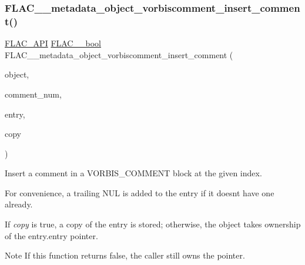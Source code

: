 \subsubsection{\texorpdfstring{F\+L\+A\+C\+\_\+\+\_\+metadata\+\_\+object\+\_\+vorbiscomment\+\_\+insert\+\_\+comment()}{FLAC\_\_metadata\_object\_vorbiscomment\_insert\_comment()}}
{\footnotesize\ttfamily \hyperlink{group__flac__export_ga56ca07df8a23310707732b1c0007d6f5}{F\+L\+A\+C\+\_\+\+A\+PI} \hyperlink{ordinals_8h_a95103469f1cbd78b8cf250194985b34e}{F\+L\+A\+C\+\_\+\+\_\+bool} F\+L\+A\+C\+\_\+\+\_\+metadata\+\_\+object\+\_\+vorbiscomment\+\_\+insert\+\_\+comment (\begin{DoxyParamCaption}\item[{\hyperlink{struct_f_l_a_c_____stream_metadata}{F\+L\+A\+C\+\_\+\+\_\+\+Stream\+Metadata} $\ast$}]{object,  }\item[{unsigned}]{comment\+\_\+num,  }\item[{\hyperlink{struct_f_l_a_c_____stream_metadata___vorbis_comment___entry}{F\+L\+A\+C\+\_\+\+\_\+\+Stream\+Metadata\+\_\+\+Vorbis\+Comment\+\_\+\+Entry}}]{entry,  }\item[{\hyperlink{ordinals_8h_a95103469f1cbd78b8cf250194985b34e}{F\+L\+A\+C\+\_\+\+\_\+bool}}]{copy }\end{DoxyParamCaption})}

Insert a comment in a V\+O\+R\+B\+I\+S\+\_\+\+C\+O\+M\+M\+E\+NT block at the given index.

For convenience, a trailing N\+UL is added to the entry if it doesn\textquotesingle{}t have one already.

If {\itshape copy} is {\ttfamily true}, a copy of the entry is stored; otherwise, the object takes ownership of the {\ttfamily entry.\+entry} pointer.

\begin{DoxyNote}{Note}
If this function returns {\ttfamily false}, the caller still owns the pointer.
\end{DoxyNote}


